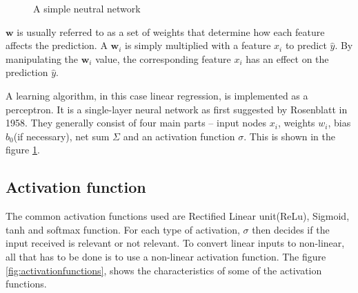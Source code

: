\begin{figure}
    \centering
        \def\svgwidth{0.55\textwidth}
        
        \caption{A simple neutral network}
        \label{fig:simpleNN}
\end{figure}


$\mathbf{w}$ is usually referred to as a set of weights that determine how each feature
affects the prediction. A $\mathbf{w}_i$ is simply multiplied with a feature $x_i$ to
predict $\hat y$. By manipulating the $\mathbf{w}_i$ value, the corresponding feature $x_i$ has
an effect on the prediction  $\hat y$.

A learning algorithm, in this case linear regression, is implemented as a perceptron. It
is a single-layer neural network as first suggested by Rosenblatt in 1958. They generally consist of four main parts -- input
nodes $x_i$, weights $w_i$, bias $b_0$(if necessary), net sum $\Sigma$ and an activation
function $\sigma$. This is shown in the figure \ref{fig:simpleNN}.

\subsection{Activation function}
\label{subsec:activationfunction}
The common activation functions used are Rectified Linear unit(ReLu), Sigmoid, tanh and
softmax function. For each type of activation, $\sigma$ then decides if the input received is
relevant or not relevant. To convert linear inputs to non-linear, all that has to be done
is to use a non-linear activation function. The figure \ref{fig:activationfunctions},
shows the characteristics of some of the activation functions.

